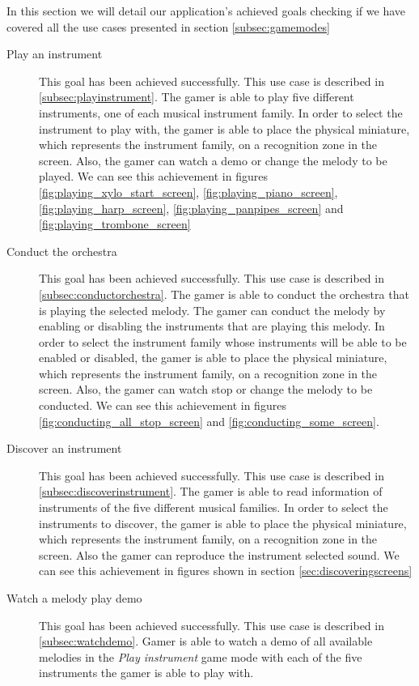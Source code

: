 In this section we will detail our application's achieved goals checking if we have covered all the use cases presented in section \ref{subsec:gamemodes} 

\begin{description}
\item[Play an instrument]
This goal has been achieved successfully. This use case is described in \ref{subsec:playinstrument}. The gamer is able to play five different instruments, one of each musical instrument family. In order to select the instrument to play with, the gamer is able to place the physical miniature, which represents the instrument family, on a recognition zone in the screen. Also, the gamer can watch a demo or change the melody to be played. We can see this achievement in figures \ref{fig:playing_xylo_start_screen}, \ref{fig:playing_piano_screen}, \ref{fig:playing_harp_screen}, \ref{fig:playing_panpipes_screen} and \ref{fig:playing_trombone_screen}

\item[Conduct the orchestra]
This goal has been achieved successfully. This use case is described in \ref{subsec:conductorchestra}. The gamer is able to conduct the orchestra that is playing the selected melody. The gamer can conduct the melody by enabling or disabling the instruments that are playing this melody. In order to select the instrument family whose instruments will be able to be enabled or disabled, the gamer is able to place the physical miniature, which represents the instrument family, on a recognition zone in the screen. Also, the gamer can watch stop or change the melody to be conducted. We can see this achievement in figures \ref{fig:conducting_all_stop_screen} and \ref{fig:conducting_some_screen}.

\item[Discover an instrument]
This goal has been achieved successfully. This use case is described in \ref{subsec:discoverinstrument}. The gamer is able to read information of instruments of the five different musical families. In order to select the instruments to discover, the gamer is able to place the physical miniature, which represents the instrument family, on a recognition zone in the screen. Also the gamer can reproduce the instrument selected sound. We can see this achievement in figures shown in section \ref{sec:discoveringscreens}

\item[Watch a melody play demo]
This goal has been achieved successfully. This use case is described in \ref{subsec:watchdemo}. Gamer is able to watch a demo of all available melodies in the \textit{Play instrument} game mode with each of the five instruments the gamer is able to play with.


\end{description}

